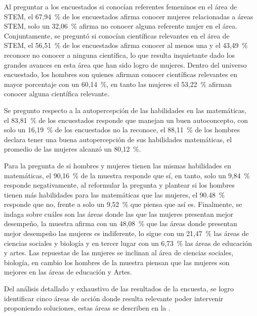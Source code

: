 \documentclass[spanish]{textolivre}
\begin{document}
Al preguntar a los encuestados si conocían referentes femeninos en el área de STEM, el 67,94~\% de los encuestados afirma conocer mujeres relacionadas a áreas STEM, solo un 32,06~\% afirma no conocer alguna referente mujer en el área. Conjuntamente, se preguntó si conocían científicas relevantes en el área de STEM, el 56,51~\% de los encuestados afirma conocer al menos una y el 43,49~\% reconoce no conocer a ninguna científica, lo que resulta inquietante dado los grandes avances en esta área que han sido logro de mujeres. Dentro del universo encuestado, los hombres son quienes afirman conocer científicas relevantes en mayor porcentaje con un 60,14~\%, en tanto las mujeres el 53,22~\% afirman conocer alguna científica relevante.

Se pregunto respecto a la autopercepción de las habilidades en las matemáticas, el 83,81~\% de los encuestados responde que manejan un buen autoconcepto, con solo un 16,19~\% de los encuestados no la reconoce, el 88,11~\% de los hombres declara tener una buena autopercepción de sus habilidades matemáticas, el promedio de las mujeres alcanzó un 80,12~\%.

Para la pregunta de si hombres y mujeres tienen las mismas habilidades en matemáticas, el 90,16~\% de la muestra responde que sí, en tanto, solo un 9,84~\% responde negativamente, al reformular la pregunta y plantear si los hombres tienen más habilidades para las matemáticas que las mujeres, el 90.48~\% responde que no, frente a solo un 9,52~\% que piensa que así es. 
Finalmente, se indaga sobre cuáles son las áreas donde las que las mujeres presentan mejor desempeño, la muestra afirma con un 48,08~\% que las áreas donde presentan mejor desempeño las mujeres es indiferente, lo sigue con un 21,47~\% las áreas de ciencias sociales y biología y en tercer lugar con un 6,73~\% las áreas de educación y artes. Las repuestas de las mujeres se inclinan al área de ciencias sociales, biología, en cambio los hombres de la muestra piensan que las mujeres son mejores en las áreas de educación y Artes.

Del análisis detallado y exhaustivo de las resultados de la encuesta, se logro identificar cinco áreas de acción donde resulta relevante poder intervenir proponiendo soluciones, estas áreas se describen en la .
\end{document}
